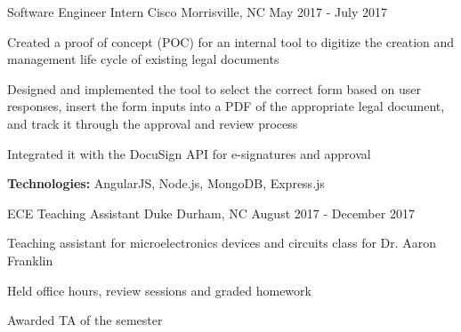 \begin{cventries}
  \cventry
    {Software Engineer Intern} %
    {Cisco} %
    {Morrisville, NC} %
    {May 2017 - July 2017} %
    {
      \begin{cvitems} %
        \item{Created a proof of concept (POC) for an internal tool to digitize the creation and management life cycle of existing legal documents}
        \item{Designed and implemented the tool to select the correct form based on user responses, insert the form inputs into a PDF of the appropriate legal document, and track it through the approval and review process}
        \item{Integrated it with the DocuSign API for e-signatures and approval}
        {\setlength \itemindent{-2ex} \itemsep2pt \item[] \textbf{Technologies:} AngularJS, Node.js, MongoDB, Express.js}
      \end{cvitems}
    }
    
    \cventry
    {ECE Teaching Assistant} %
    {Duke} %
    {Durham, NC} %
    {August 2017 - December 2017} %
    {
      \begin{cvitems} %
        \item{Teaching assistant for microelectronics devices and circuits class for Dr. Aaron Franklin}
        \item{Held office hours, review sessions and graded homework}
        \item{Awarded TA of the semester}
      \end{cvitems}
    }
\end{cventries}
